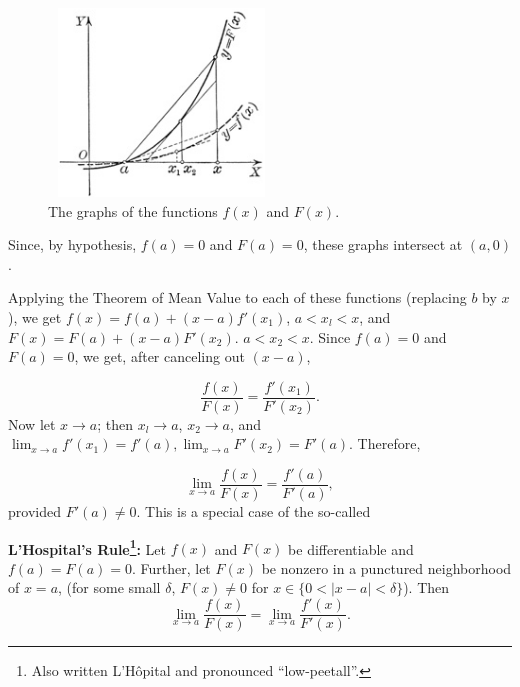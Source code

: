 \begin{figure}[h!]
\begin{minipage}{\textwidth}
\begin{center}
\includegraphics[height=5cm,width=6cm]{ch13-0over0form.eps}
\end{center}
\end{minipage}
\caption{The graphs of the functions $f(x)$ and $F(x)$.}
\label{fig:ch13-0over0form}
\end{figure}
Since, by hypothesis, $f(a) = 0$ and $F(a) = 0$, these graphs intersect at $(a, 0)$.

Applying the Theorem of Mean Value to each of these functions (replacing $b$ by $x$), 
we get
$f(x) = f(a) + (x-a)f'(x_1)$, $a < x_l < x$, and
$F(x) = F(a) + (x-a)F'(x_2)$. $a < x_2 < x$.
Since $f(a) = 0$ and $F(a) = 0$, we get, after canceling out $(x-a)$,

\[
\frac{f(x)}{F(x)} = \frac{f'(x_1)}{F'(x_2)}.
\]
Now let $x \to a$; then $x_l \to a$, $x_2 \to a$, and
$
\lim_{x \to a} f'(x_1) = f'(a), \lim_{x \to a} F'(x_2) = F'(a).
$
Therefore,

\begin{equation}
\label{eqn:111-49}
\lim_{x \to a} \frac{f(x)}{F(x)} = \frac{f'(a)}{F'(a)},
\end{equation}
provided $F'(a) \ne 0$.
This is a special case of the so-called 

\noindent
{\bf L'Hospital's Rule\footnote{Also written L'H\^opital and
pronounced ``low-peetall''.}:}
Let $f(x)$ and $F(x)$ be differentiable and $f(a) = F(a) = 0$.  
Further, let $F(x)$ be nonzero in a punctured neighborhood of $x= a$, 
(for some small $\delta$, $F(x) \neq 0$ for $x \in \{0 < |x - a| < \delta\}$).  
Then
\[
\lim_{x \to a} \frac{f(x)}{F(x)} = \lim_{x \to a} \frac{f'(x)}{F'(x)}.
\]

